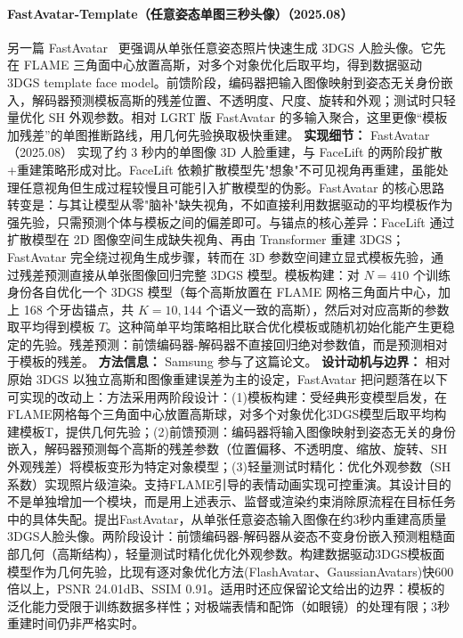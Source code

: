 \paragraph{FastAvatar-Template（任意姿态单图三秒头像）（2025.08）}
另一篇 FastAvatar~\cite{2508_18389} 更强调从单张任意姿态照片快速生成 3DGS 人脸头像。它先在 FLAME 三角面中心放置高斯，对多个对象优化后取平均，得到数据驱动 3DGS template face model。前馈阶段，编码器把输入图像映射到姿态无关身份嵌入，解码器预测模板高斯的残差位置、不透明度、尺度、旋转和外观；测试时只轻量优化 SH 外观参数。相对 LGRT 版 FastAvatar 的多输入聚合，这里更像“模板加残差”的单图推断路线，用几何先验换取极快重建。
\textbf{实现细节：} FastAvatar（2025.08） 实现了约 3 秒内的单图像 3D 人脸重建，与 FaceLift 的两阶段扩散+重建策略形成对比。FaceLift 依赖扩散模型先"想象"不可见视角再重建，虽能处理任意视角但生成过程较慢且可能引入扩散模型的伪影。FastAvatar 的核心思路转变是：与其让模型从零"脑补"缺失视角，不如直接利用数据驱动的平均模板作为强先验，只需预测个体与模板之间的偏差即可。与锚点的核心差异：FaceLift 通过扩散模型在 2D 图像空间生成缺失视角、再由 Transformer 重建 3DGS；FastAvatar 完全绕过视角生成步骤，转而在 3D 参数空间建立显式模板先验，通过残差预测直接从单张图像回归完整 3DGS 模型。模板构建：对 $N=410$ 个训练身份各自优化一个 3DGS 模型（每个高斯放置在 FLAME 网格三角面片中心，加上 168 个牙齿锚点，共 $K=10{,}144$ 个语义一致的高斯），然后对对应高斯的参数取平均得到模板 $T$。这种简单平均策略相比联合优化模板或随机初始化能产生更稳定的先验。残差预测：前馈编码器-解码器不直接回归绝对参数值，而是预测相对于模板的残差。
\textbf{方法信息：} Samsung 参与了这篇论文。
\textbf{设计动机与边界：} 相对原始 3DGS 以独立高斯和图像重建误差为主的设定，FastAvatar 把问题落在以下可实现的改动上：方法采用两阶段设计：(1)模板构建：受经典形变模型启发，在FLAME网格每个三角面中心放置高斯球，对多个对象优化3DGS模型后取平均构建模板T，提供几何先验；(2)前馈预测：编码器将输入图像映射到姿态无关的身份嵌入，解码器预测每个高斯的残差参数（位置偏移、不透明度、缩放、旋转、SH外观残差）将模板变形为特定对象模型；(3)轻量测试时精化：优化外观参数（SH系数）实现照片级渲染。支持FLAME引导的表情动画实现可控重演。其设计目的不是单独增加一个模块，而是用上述表示、监督或渲染约束消除原流程在目标任务中的具体失配。提出FastAvatar，从单张任意姿态输入图像在约3秒内重建高质量3DGS人脸头像。两阶段设计：前馈编码器-解码器从姿态不变身份嵌入预测粗糙面部几何（高斯结构），轻量测试时精化优化外观参数。构建数据驱动3DGS模板面模型作为几何先验，比现有逐对象优化方法(FlashAvatar、GaussianAvatars)快600倍以上，PSNR 24.01dB、SSIM 0.91。适用时还应保留论文给出的边界：模板的泛化能力受限于训练数据多样性；对极端表情和配饰（如眼镜）的处理有限；3秒重建时间仍非严格实时。
